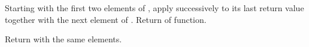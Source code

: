 \begin{LIST}{1cm}
  {
  Starting with the first two elements of , apply
   successively to its last return value together with the next
  element of . Return  of {function}.
  }

  {
  Return  with the same elements.
  }


\end{LIST}



